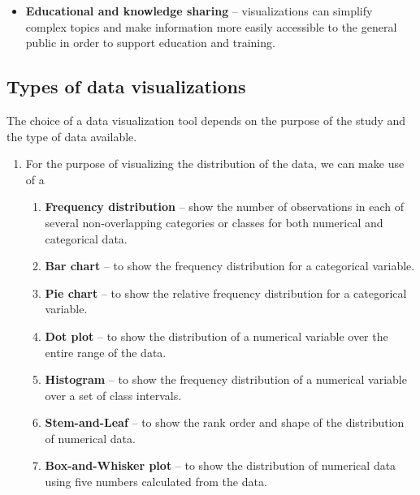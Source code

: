 \documentclass[
]{book}
\providecommand{\tightlist}{%
  \setlength{\itemsep}{0pt}\setlength{\parskip}{0pt}}
\begin{document}
\begin{itemize}
\tightlist
\item
  \textbf{Educational and knowledge sharing} -- visualizations can simplify complex topics and make information more easily accessible to the general public in order to support education and training.
\end{itemize}

\subsection{Types of data visualizations}\label{types-of-data-visualizations}

The choice of a data visualization tool depends on the purpose of the study and the type of data available.

\begin{enumerate}
\def\labelenumi{\arabic{enumi}.}
\item
  For the purpose of visualizing the distribution of the data, we can make use of a

  \begin{enumerate}
  \def\labelenumii{\alph{enumii}.}
  \item
    \textbf{Frequency distribution} -- show the number of observations in each of several non-overlapping categories or classes for both numerical and categorical data.
  \item
    \textbf{Bar chart} -- to show the frequency distribution for a categorical variable.
  \item
    \textbf{Pie chart} -- to show the relative frequency distribution for a categorical variable.
  \item
    \textbf{Dot plot} -- to show the distribution of a numerical variable over the entire range of the data.
  \item
    \textbf{Histogram} -- to show the frequency distribution of a numerical variable over a set of class intervals.
  \item
    \textbf{Stem-and-Leaf} -- to show the rank order and shape of the distribution of numerical data.
  \item
    \textbf{Box-and-Whisker plot} -- to show the distribution of numerical data using five numbers calculated from the data.
  \end{enumerate}
\end{enumerate}
\end{document}
